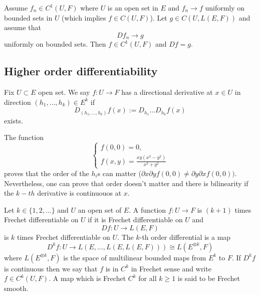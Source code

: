 \begin{proposition}
    Assume $f_n \in C^1(U, F)$ where $U$ is an open set in $E$ and $f_n \rightarrow f$ uniformly on bounded sets in $U$ (which implies $f \in C(U,F)$). Let $g \in C(U, L(E,F))$ and assume that
    \begin{equation}
        Df_n \rightarrow g 
    \end{equation}
    uniformly on bounded sets. Then $f \in C^1(U, F)$ and $Df = g.$
\end{proposition}

\subsection{Higher order differentiability}

\begin{definition}
    Fix $U \subset E$ open set. We say $f:U \rightarrow F$ has a directional derivative at $x \in U$ in direction $(h_1, \ldots, h_k) \in E^k$ if 
    \begin{equation}
        D_{(h_1, \ldots, h_k)} f(x) := D_{h_1} \ldots D_{h_k} f(x)
    \end{equation}
    exists.
\end{definition}

\begin{observation}
    The function 
    \begin{equation}
        \begin{cases}
            f(0,0) = 0, \\
            f(x,y) = \frac{xy (x^2 - y^2)}{x^2 + y^2}
        \end{cases}
    \end{equation}
    proves that the order of the $h_i$s can matter ($\partial x \partial y f(0,0) \neq \partial y \partial x f(0,0))$.
    Nevertheless, one can prove that order doesn't matter and there is bilinearity if the $k-th$ derivative is continuouos at $x$.
\end{observation}

\begin{definition}
    Let $k \in \{ 1, 2, \ldots\}$ and $U$ an open set of $E$. A function $f: U \rightarrow F$ is $(k + 1)$ times Frechet differentiable on $U$ if it is Frechet differentiable on $U$ and
    \begin{equation}
        Df: U \rightarrow L(E,F)
    \end{equation}
    is $k$ times Frechet differentiable on $U$. The $k$-th order differential is a map
    \begin{equation}
        D^k f: U \rightarrow L(E, \ldots, L(E, L(E, F))) \cong L(E^{\otimes k}, F)
    \end{equation}
    where $L(E^{\otimes k}, F)$ is the space of multilinear bounded maps from $E^k$ to $F$.
    If $D^k f$ is continuous then we say that $f$ is in $C^k$ in Frechet sense and write $f \in C^k(U,F).$
    A map which is Frechet $C^k$ for all $k \geq 1$ is said to be Frechet smooth.
\end{definition}

